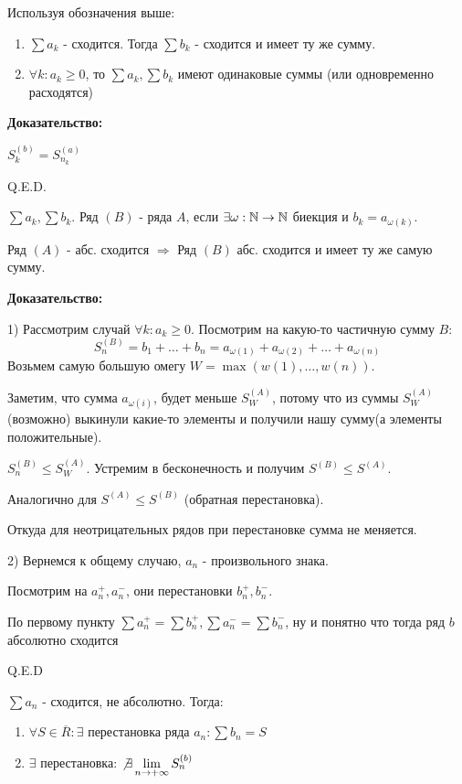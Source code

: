 
Используя обозначения выше:
\begin{enumerate}
    \item $\sum a_k$ - сходится. Тогда $\sum b_k$ - сходится  и имеет ту же сумму.
    \item $\forall k: a_k\geq 0$, то $\sum a_k, \sum b_k$ имеют одинаковые суммы (или одновременно расходятся)
\end{enumerate}

\textbf{Доказательство:}

$S_k^{(b)} = S^{(a)}_{n_k}$


\hfill Q.E.D.

 $\sum a_k,  \sum b_k$. Ряд $(B)$ -  ряда $A$, если $\exists \omega: \mathbb{N} \rightarrow \mathbb{N}$  биекция и $b_k = a_{\omega(k)}$.


Ряд $(A)$ - абс. сходится $\Rightarrow$ Ряд $(B)$ абс. сходится и имеет ту же самую сумму.

\textbf{Доказательство:}

1) Рассмотрим случай $\forall k: a_k \geq 0$.  Посмотрим на какую-то частичную сумму $B$:
$$S_n^{(B)} = b_1 + \ldots + b_n = a_{\omega(1)} + a_{\omega(2)} + \ldots + a_{\omega(n)}$$
Возьмем самую большую омегу $W = \max(w(1),\ldots,w(n))$. 

Заметим, что сумма $a_{\omega(i)}$, будет меньше $S^{(A)}_{W}$, потому что из суммы $S^{(A)}_{W}$ (возможно) выкинули какие-то элементы и получили нашу сумму(а элементы положительные).

$S_n^{(B)}\leq S_W^{(A)}$. Устремим в бесконечность и получим $S^{(B)}\leq S^{(A)}$.

Аналогично для $S^{(A)}\leq S^{(B)}$ (обратная перестановка).

Откуда для неотрицательных рядов при перестановке сумма не меняется.

2) Вернемся к общему случаю, $a_n$ - произвольного знака.

Посмотрим на $a_n^+, a_n^-$, они перестановки $b_n^+, b_n^-$.

По первому пункту $\sum a_n^+ = \sum b_n^+, \sum a_n^- = \sum b_n^-$, ну и понятно что тогда ряд $b$ абсолютно сходится

\hfill Q.E.D


$\sum a_n$ - сходится, не абсолютно. Тогда:

\begin{enumerate}
    \item $\forall S \in \overline{R}: \exists$ перестановка ряда $a_n: \sum b_n = S$
    \item $\exists$ перестановка: $\not \exists \lim\limits_{n\rightarrow + \infty}S_n^{(b)}$
\end{enumerate}

